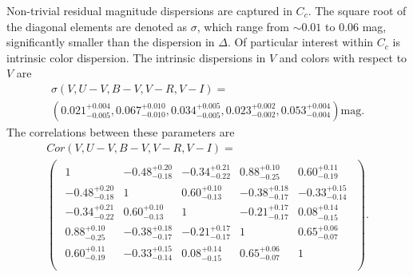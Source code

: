 \documentclass{aastex61}   	%
\begin{document}
Non-trivial residual magnitude dispersions are captured in $C_c$.  The square
root of the diagonal elements are denoted as $\sigma$, which
range from
$\sim 0.01$ to 0.06 mag, significantly smaller
than the dispersion in $\Delta$.
\color{purple}
Of particular interest within $C_c$ is intrinsic color dispersion.  The intrinsic dispersions in $V$ and colors with respect to $V$ are
\begin{multline}
\sigma(V,U-V,B-V,V-R,V-I)=\\
\left(
0.021^{+0.004}_{-0.005} ,
0.067^{+0.010}_{-0.010},
0.034^{+0.005}_{-0.005},
0.023^{+0.002}_{-0.002},
0.053^{+0.004}_{-0.004}
\right)
 \text{mag}.
 \label{sig_intrinsic:eqn}
 \end{multline}
The correlations between these parameters are
\begin{multline}
Cor(V,U-V,B-V,V-R,V-I)=\\
\begin{pmatrix}
\begin{array}{rrrrr}
1 & -0.48^{+0.20}_{-0.18} & -0.34^{+0.21}_{-0.22} & 0.88^{+0.10}_{-0.25} & 0.60^{+0.11}_{-0.19} \\
-0.48^{+0.20}_{-0.18} & 1 & 0.60^{+0.10}_{-0.13} & -0.38^{+0.18}_{-0.17} & -0.33^{+0.15}_{-0.14} \\
-0.34^{+0.21}_{-0.22} & 0.60^{+0.10}_{-0.13} & 1 & -0.21^{+0.17}_{-0.17} & 0.08^{+0.14}_{-0.15} \\
0.88^{+0.10}_{-0.25} & -0.38^{+0.18}_{-0.17} & -0.21^{+0.17}_{-0.17} & 1 & 0.65^{+0.06}_{-0.07} \\
0.60^{+0.11}_{-0.19} & -0.33^{+0.15}_{-0.14} & 0.08^{+0.14}_{-0.15} & 0.65^{+0.06}_{-0.07} & 1 \\
\end{array}
 \end{pmatrix}.
 \label{cor_intrinsic:eqn}
 \end{multline}
\color{black}
%
\end{document}
